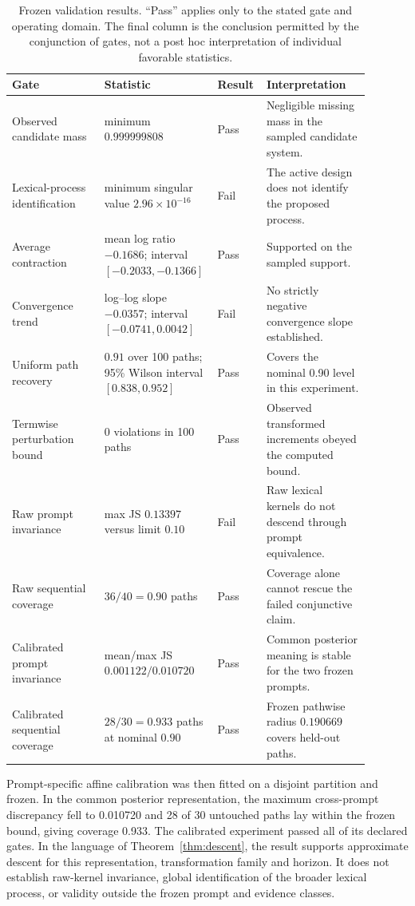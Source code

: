 \documentclass[11pt]{article}
\begin{document}
\begin{table}[H]
\centering
\caption{Frozen validation results.  ``Pass'' applies only to the stated gate
and operating domain.  The final column is the conclusion permitted by the
conjunction of gates, not a post hoc interpretation of individual favorable
statistics.}
\label{tab:validation-results}
\small
\begin{tabular}{p{0.25\linewidth}p{0.22\linewidth}p{0.13\linewidth}p{0.29\linewidth}}
\toprule
Gate & Statistic & Result & Interpretation\\
\midrule
Observed candidate mass & minimum $0.999999808$ & Pass & Negligible missing mass in the sampled candidate system.\\
Lexical-process identification & minimum singular value $2.96\times10^{-16}$ & Fail & The active design does not identify the proposed process.\\
Average contraction & mean log ratio $-0.1686$; interval $[-0.2033,-0.1366]$ & Pass & Supported on the sampled support.\\
Convergence trend & log--log slope $-0.0357$; interval $[-0.0741,0.0042]$ & Fail & No strictly negative convergence slope established.\\
Uniform path recovery & $0.91$ over 100 paths; 95\% Wilson interval $[0.838,0.952]$ & Pass & Covers the nominal 0.90 level in this experiment.\\
Termwise perturbation bound & 0 violations in 100 paths & Pass & Observed transformed increments obeyed the computed bound.\\
\midrule
Raw prompt invariance & max JS $0.13397$ versus limit $0.10$ & Fail & Raw lexical kernels do not descend through prompt equivalence.\\
Raw sequential coverage & $36/40=0.90$ paths & Pass & Coverage alone cannot rescue the failed conjunctive claim.\\
\midrule
Calibrated prompt invariance & mean/max JS $0.001122/0.010720$ & Pass & Common posterior meaning is stable for the two frozen prompts.\\
Calibrated sequential coverage & $28/30=0.933$ paths at nominal $0.90$ & Pass & Frozen pathwise radius $0.190669$ covers held-out paths.\\
\bottomrule
\end{tabular}
\end{table}

Prompt-specific affine calibration was then fitted on a disjoint partition
and frozen.  In the common posterior representation, the maximum
cross-prompt discrepancy fell to 0.010720 and 28 of 30 untouched paths lay
within the frozen bound, giving coverage 0.933.  The calibrated
experiment passed all of its declared gates.  In the language of
Theorem~\ref{thm:descent}, the result supports approximate descent for this
representation, transformation family and horizon.  It does not establish
raw-kernel invariance, global identification of the broader lexical process,
or validity outside the frozen prompt and evidence classes.
\end{document}
